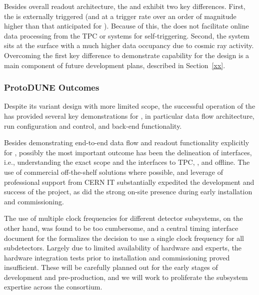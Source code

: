 Besides overall readout architecture, %
the  and
  exhibit two key differences. %
First, the   is externally
triggered (and at a trigger rate %
over an order of
magnitude higher than that anticipated for ). Because of this, 
the%
  
does not facilitate online data
processing from the TPC or  systems for self-triggering. %
Second, the  
system sits at the surface with a much higher %
data occupancy %
due to cosmic ray activity. %
Overcoming the first key difference to demonstrate  capability for the   design is a main component of future  development plans, described in Section~\ref{xx}.


\subsubsection{ProtoDUNE Outcomes}

Despite its %
variant design %
with more limited scope, the %
successful operation of the   has provided several key
demonstrations for  , in particular data flow
architecture, run configuration and control, and back-end
functionality. %

Besides demonstrating end-to-end data flow and  readout functionality
explicitly for  , possibly the most important outcome has been the delineation of
interfaces, i.e., understanding the exact  scope and the interfaces to TPC, , and offline. The use of commercial off-the-shelf solutions
where possible, and leverage of professional support from CERN IT 
substantially expedited the development and success of the project, as
did the strong on-site presence during early installation and
commissioning. 

The use of multiple clock frequencies for different
detector subsystems, on the other hand, was found to be too cumbersome, and 
a central timing interface document for the 
 \citedocdb{} formalizes the decision %
to use a single clock frequency for all  subdetectors.
Largely due to limited
availability of hardware and experts, the hardware integration tests prior to
installation and commissioning %
 proved insufficient. %
These will be %
carefully planned out for the early stages of   development and
pre-production, and we will work %
to proliferate the subsystem expertise across
the consortium. 

